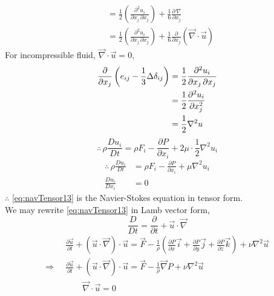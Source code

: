 \documentclass[../main-sheet.tex]{subfiles}
\begin{document}
\begin{soln}
\begin{align*}
        &=\frac{1}{2}\left( \frac{\partial^2 u_i}{\partial x_j\,\partial x_j} \right)+\frac{1}{6}\frac{\partial\,\nabla}{\partial x_j}\\
        &=\frac{1}{2}\left( \frac{\partial^2 u_i}{\partial x_j\,\partial x_j} \right)+\frac{1}{6}\frac{\partial}{\partial x_j}(\vec{\nabla}\cdot\vec{u})
    \end{align*}
    For incompressible fluid, \(\vec{\nabla}\cdot\vec{u}=0\),
    \begin{align*}
        \frac{\partial }{\partial x_j}\left( e_{ij}-\frac{1}{3}\Delta \delta_{ij} \right)&=\frac{1}{2}\frac{\partial^2 u_i}{\partial x_j\,\partial x_j}\\
        &=\frac{1}{2} \frac{\partial^2 u_i}{\partial x_j^2}\\
        &=\frac{1}{2}\nabla^2u
    \end{align*}
    \[\therefore \, \rho \frac{D u_i}{D t}=\rho F_i-\frac{\partial P}{\partial x_i}+2\mu\cdot \frac{1}{2}\nabla^2u_i\]
    \begin{equation}
        \begin{aligned}
            \therefore \, \rho \frac{D u_i}{D t}&=\rho F_i-\frac{\partial P}{\partial x_i}+\mu\nabla^2u_i\\
            \frac{D u_i}{D x_i}&=0
        \end{aligned}
        \label{eq:navTensor13}
    \end{equation}
    \(\therefore\) \eqref{eq:navTensor13} is the Navier-Stokes equation in tensor form.\\
    We may rewrite \eqref{eq:navTensor13} in Lamb vector form,
    \[\frac{D}{D t}=\frac{\partial }{\partial t}+\vec{u}\cdot \vec{\nabla}\]
    \begin{align*}
        &\frac{\partial \vec{u}}{\partial t}+(\vec{u}\cdot \vec{\nabla})\cdot\vec{u}=\vec{F}-\frac{1}{\rho}\left( \frac{\partial P}{\partial x}\vec{i}+\frac{\partial P}{\partial y}\vec{j}+\frac{\partial P}{\partial z}\vec{k} \right)+\nu\nabla^2 \vec{u}\\
        \Rightarrow\;\;&\frac{\partial \vec{u}}{\partial t}+(\vec{u}\cdot \vec{\nabla})\cdot\vec{u}=\vec{F}-\frac{1}{\rho}\vec{\nabla}P+\nu\nabla^2 \vec{u}\\
        &\qquad\vec{\nabla}\cdot\vec{u}=0
    \end{align*}
\end{soln}  
\end{document}
